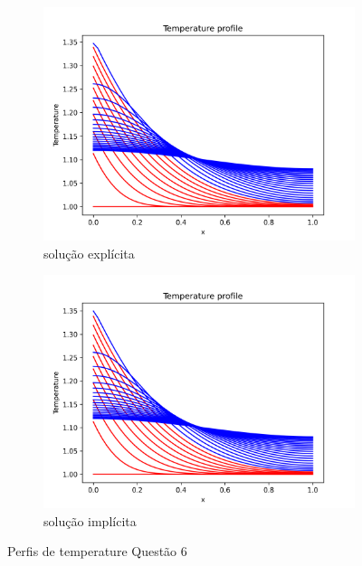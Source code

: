 \documentclass{article}
\begin{document}
\begin{figure}
\centering
     \begin{subfigure}[b]{0.49\textwidth}
         \centering
         \includegraphics[width=\textwidth]{figs/q6a_temperature_profile.png}
         \caption{ solução explícita}
	\label{fig:q6a_temperature_profile}
     \end{subfigure}
     \hfill
     \begin{subfigure}[b]{0.49\textwidth}
         \centering
         \includegraphics[width=\textwidth]{figs/q6b_temperature_profile.png}
         \caption{solução implícita}
	\label{fig:q6b_temperature_profile}
     \end{subfigure}
\caption{Perfis de temperature Questão 6}
\end{figure}
\end{document}
